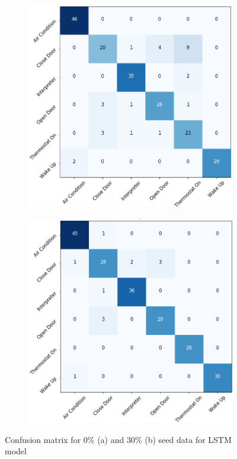 \documentclass[10pt,twocolumn,letterpaper]{article}
\begin{document}
\begin{figure}
	\begin{center}
		\begin{subfigure}{.45\textwidth}
			\includegraphics[width=\linewidth, height=.25\textheight]{cm_zero_percent_cropped}
			\caption{}
			\label{fig:cm_zero} 
		\end{subfigure}
		
		\begin{subfigure}{.45\textwidth}
			\includegraphics[width=\linewidth, height=.25\textheight]{cm_thirty_percent_cropped}
			\caption{}
			\label{fig:cm_thirty} 
		\end{subfigure}
	\end{center}
	\caption{Confusion matrix for $0\%$ (a) and $30\%$ (b) seed data for LSTM model}
	\label{fig:conf_mat}
\end{figure}
\end{document}
